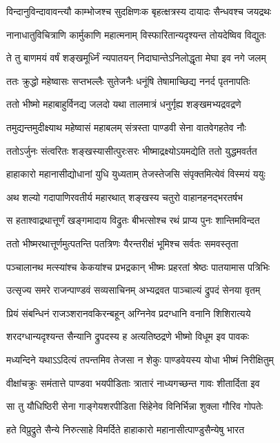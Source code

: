 \twolineshloka
{विन्दानुविन्दावावन्त्यौ काम्भोजश्च सुदक्षिणःक}
{बृहत्क्षत्रस्य दायादः सैन्धवश्च जयद्रथः}


\twolineshloka
{नानाधातुविचित्राणि कार्मुकाणि महात्मनाम्}
{विस्फारितान्यदृश्यन्त तोयदेष्विव विद्युतः}


\twolineshloka
{ते तु बाणमयं वर्षं शङ्खमूर्ध्निं न्यपातयन्}
{निदाघान्तेऽनिलोद्धृता मेघा इव नगे जलम्}


\twolineshloka
{ततः क्रुद्धो महेष्वासः सप्तभल्लैः सुतेजनैः}
{धनूंषि तेषामाच्छिद्य ननर्द पृतनापतिः}


\twolineshloka
{ततो भीष्मो महाबाहुर्विनद्य जलदो यथा}
{तालमात्रं धनुर्गृह्य शङ्खमभ्यद्रवद्रणे}


\twolineshloka
{तमुद्यन्तमुदीक्ष्याथ महेष्वासं महाबलम्}
{संत्रस्ता पाण्डवी सेना वातवेगहतेव नौः}


\twolineshloka
{ततोऽर्जुनः संत्वरितः शङ्खस्यासीत्पुरःसरः}
{भीष्माद्रक्ष्योऽयमद्येति ततो युद्धमवर्तत}


\twolineshloka
{हाहाकारो महानासीद्योधानां युधि युध्यताम्}
{तेजस्तेजसि संपृक्तमित्येवं विस्मयं ययुः}


\twolineshloka
{अथ शल्यो गदापाणिरवतीर्य महारथात्}
{शङ्खस्य चतुरो वाहानहनद्भरतर्षभ}


\twolineshloka
{स हताश्वाद्रथात्तूर्णं खङ्गमादाय विद्रुतः}
{बीभत्सोश्च रथं प्राप्य पुनः शान्तिमविन्दत}


\twolineshloka
{ततो भीष्मरथात्तूर्णमुत्पतन्ति पतत्रिणः}
{यैरन्तरीक्षं भूमिश्च सर्वतः समवस्तृता}


\twolineshloka
{पञ्चालानथ मत्स्यांश्च केकयांश्च प्रभद्रकान्}
{भीष्मः प्रहरतां श्रेष्ठः पातयामास पत्रिभिः}


\twolineshloka
{उत्सृज्य समरे राजन्पाण्डवं सव्यसाचिनम्}
{अभ्यद्रवत पाञ्चाल्यं द्रुपदं सेनया वृतम्}


\twolineshloka
{प्रियं संबन्धिनं राजञ्शरानवकिरन्बहून्}
{अग्निनेव प्रदग्धानि वनानि शिशिरात्यये}


\twolineshloka
{शरदग्धान्यदृश्यन्त सैन्यानि द्रुपदस्य ह}
{अत्यतिष्ठद्रणे भीष्मो विधूम इव पावकः}


\twolineshloka
{मध्यन्दिने यथाऽऽदित्यं तपन्तमिव तेजसा}
{न शेकुः पाण्डवेयस्य योधा भीष्मं निरीक्षितुम्}


\twolineshloka
{वीक्षांचक्रुः समंतात्ते पाण्डवा भयपीडिताः}
{त्रातारं नाध्यगच्छन्त गावः शीतार्दिता इव}


\twolineshloka
{सा तु यौधिष्ठिरी सेना गाङ्गेयशरपीडिता}
{सिंहेनेव विनिर्भिन्ना शुक्ला गौरिव गोपतेः}


\twolineshloka
{हते विप्रुद्रुते सैन्ये निरुत्साहे विमर्दिते}
{हाहाकारो महानासीत्पाण्डुसैन्येषु भारत}


